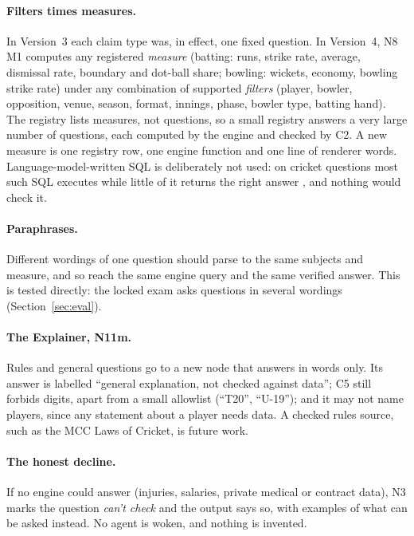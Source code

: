 \documentclass[11pt,a4paper]{article}
\begin{document}
\paragraph{Filters times measures.} In Version~3 each claim type was, in effect,
one fixed question. In Version~4, N8 M1 computes any registered \emph{measure}
(batting: runs, strike rate, average, dismissal rate, boundary and dot-ball
share; bowling: wickets, economy, bowling strike rate) under any combination of
supported \emph{filters} (player, bowler, opposition, venue, season, format,
innings, phase, bowler type, batting hand). The registry lists measures, not
questions, so a small registry answers a very large number of questions, each
computed by the engine and checked by C2. A new measure is one registry row, one
engine function and one line of renderer words. Language-model-written SQL is
deliberately not used: on cricket questions most such SQL executes while little
of it returns the right answer \cite{cricbench}, and nothing would check it.

\paragraph{Paraphrases.} Different wordings of one question should parse to the
same subjects and measure, and so reach the same engine query and the same
verified answer. This is tested directly: the locked exam asks questions in
several wordings (Section~\ref{sec:eval}).

\paragraph{The Explainer, N11m.} Rules and general questions go to a new node
that answers in words only. Its answer is labelled ``general explanation, not
checked against data''; C5 still forbids digits, apart from a small allowlist
(``T20'', ``U-19''); and it may not name players, since any statement about a
player needs data. A checked rules source, such as the MCC Laws of Cricket, is
future work.

\paragraph{The honest decline.} If no engine could answer (injuries, salaries,
private medical or contract data), N3 marks the question \emph{can't check} and
the output says so, with examples of what can be asked instead. No agent is
woken, and nothing is invented.
\end{document}
